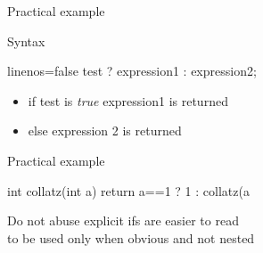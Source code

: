 \begin{frame}[fragile]
  \begin{exampleblock}{Practical example}
  \end{exampleblock}
\end{frame}

\begin{frame}[fragile]
  \begin{block}{Syntax}
    \begin{cppcode*}{linenos=false}
      test ? expression1 : expression2;
    \end{cppcode*}
    \vspace{-0.3cm}
    \begin{itemize}
      \item if test is {\it true} expression1 is returned
      \item else expression 2 is returned
    \end{itemize}
  \end{block}
  \pause
  \begin{exampleblock}{Practical example}
    \begin{cppcode*}{}
      int collatz(int a) {
        return a==1 ? 1 : collatz(a%
      }
    \end{cppcode*}
  \end{exampleblock}
  \pause
  \begin{alertblock}{Do not abuse}
    explicit ifs are easier to read \\
    to be used only when obvious and not nested
  \end{alertblock}
\end{frame}

